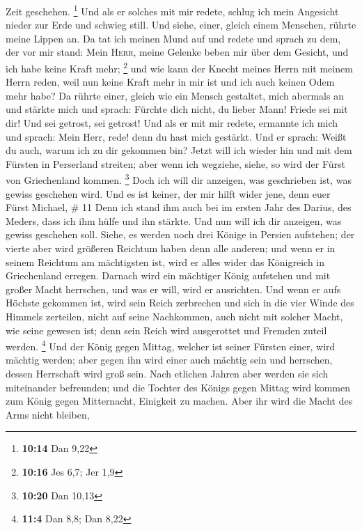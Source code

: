 Zeit geschehen. \footnote{\textbf{10:14} Dan 9,22}  Und
als er solches mit mir redete, schlug ich mein Angesicht nieder zur Erde
und schwieg still.  Und siehe, einer, gleich einem
Menschen, rührte meine Lippen an. Da tat ich meinen Mund auf und redete
und sprach zu dem, der vor mir stand: Mein \textsc{Herr}, meine Gelenke
beben mir über dem Gesicht, und ich habe keine Kraft mehr; \footnote{\textbf{10:16}
  Jes 6,7; Jer 1,9}  und wie kann der Knecht meines Herrn
mit meinem Herrn reden, weil nun keine Kraft mehr in mir ist und ich
auch keinen Odem mehr habe?  Da rührte einer, gleich wie
ein Mensch gestaltet, mich abermals an und stärkte mich 
und sprach: Fürchte dich nicht, du lieber Mann! Friede sei mit dir! Und
sei getrost, sei getrost! Und als er mit mir redete, ermannte ich mich
und sprach: Mein Herr, rede! denn du hast mich gestärkt. 
Und er sprach: Weißt du auch, warum ich zu dir gekommen bin? Jetzt will
ich wieder hin und mit dem Fürsten in Perserland streiten; aber wenn ich
wegziehe, siehe, so wird der Fürst von Griechenland kommen. \footnote{\textbf{10:20}
  Dan 10,13}  Doch ich will dir anzeigen, was geschrieben
ist, was gewiss geschehen wird. Und es ist keiner, der mir hilft wider
jene, denn euer Fürst Michael, \# 11  Denn ich stand ihm
auch bei im ersten Jahr des Darius, des Meders, dass ich ihm hülfe und
ihn stärkte.  Und nun will ich dir anzeigen, was gewiss
geschehen soll. Siehe, es werden noch drei Könige in Persien aufstehen;
der vierte aber wird größeren Reichtum haben denn alle anderen; und wenn
er in seinem Reichtum am mächtigsten ist, wird er alles wider das
Königreich in Griechenland erregen.  Darnach wird ein
mächtiger König aufstehen und mit großer Macht herrschen, und was er
will, wird er ausrichten.  Und wenn er aufs Höchste
gekommen ist, wird sein Reich zerbrechen und sich in die vier Winde des
Himmels zerteilen, nicht auf seine Nachkommen, auch nicht mit solcher
Macht, wie seine gewesen ist; denn sein Reich wird ausgerottet und
Fremden zuteil werden. \footnote{\textbf{11:4} Dan 8,8; Dan 8,22}
 Und der König gegen Mittag, welcher ist seiner Fürsten
einer, wird mächtig werden; aber gegen ihn wird einer auch mächtig sein
und herrschen, dessen Herrschaft wird groß sein.  Nach
etlichen Jahren aber werden sie sich miteinander befreunden; und die
Tochter des Königs gegen Mittag wird kommen zum König gegen Mitternacht,
Einigkeit zu machen. Aber ihr wird die Macht des Arms nicht bleiben,
